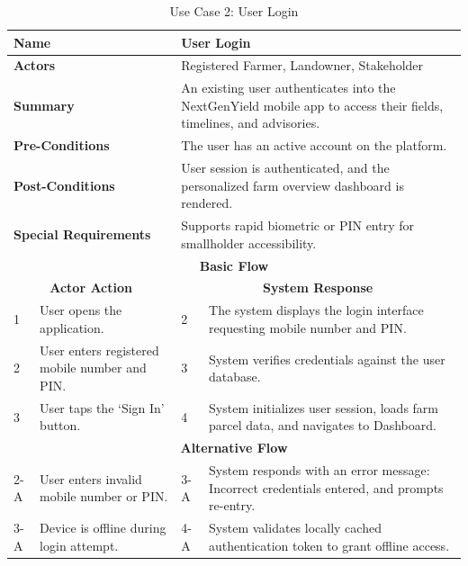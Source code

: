\begin{table}[H]
\small
\centering
\caption{Use Case 2: User Login}
\label{tab:uc2}
\begin{tabular}{|p{0.6cm}|p{6.4cm}|p{0.8cm}|p{6.6cm}|}
\hline
\multicolumn{2}{|p{7.0cm}|}{\textbf{Name}} & \multicolumn{2}{p{7.4cm}|}{User Login} \\ \hline
\multicolumn{2}{|p{7.0cm}|}{\textbf{Actors}} & \multicolumn{2}{p{7.4cm}|}{Registered Farmer, Landowner, Stakeholder} \\ \hline
\multicolumn{2}{|p{7.0cm}|}{\textbf{Summary}} & \multicolumn{2}{p{7.4cm}|}{An existing user authenticates into the NextGenYield mobile app to access their fields, timelines, and advisories.} \\ \hline
\multicolumn{2}{|p{7.0cm}|}{\textbf{Pre-Conditions}} & \multicolumn{2}{p{7.4cm}|}{The user has an active account on the platform.} \\ \hline
\multicolumn{2}{|p{7.0cm}|}{\textbf{Post-Conditions}} & \multicolumn{2}{p{7.4cm}|}{User session is authenticated, and the personalized farm overview dashboard is rendered.} \\ \hline
\multicolumn{2}{|p{7.0cm}|}{\textbf{Special Requirements}} & \multicolumn{2}{p{7.4cm}|}{Supports rapid biometric or PIN entry for smallholder accessibility.} \\ \hline
\multicolumn{4}{|c|}{\textbf{Basic Flow}} \\ \hline
\multicolumn{2}{|c|}{\textbf{Actor Action}} & \multicolumn{2}{c|}{\textbf{System Response}} \\ \hline
1 & User opens the application. & 2 & The system displays the login interface requesting mobile number and PIN. \\ \hline
2 & User enters registered mobile number and PIN. & 3 & System verifies credentials against the user database. \\ \hline
3 & User taps the `Sign In' button. & 4 & System initializes user session, loads farm parcel data, and navigates to Dashboard. \\ \hline
\multicolumn{4}{|c|}{\textbf{Alternative Flow}} \\ \hline
2-A & User enters invalid mobile number or PIN. & 3-A & System responds with an error message: Incorrect credentials entered, and prompts re-entry. \\ \hline
3-A & Device is offline during login attempt. & 4-A & System validates locally cached authentication token to grant offline access. \\ \hline
\end{tabular}
\end{table}

